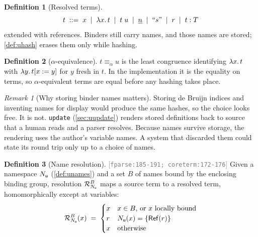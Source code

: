 \documentclass[11pt]{article}
\theoremstyle{definition}
\newtheorem{definition}{Definition}[section]
\theoremstyle{plain}
\theoremstyle{remark}
\newtheorem{remark}{Remark}[section]
\newcommand{\src}[1]{{\footnotesize\textcolor{gray}{[\texttt{#1}]}}}
\begin{document}
\begin{definition}[Resolved terms]\label{def:urterm}
\[
  t \;::=\; x \;\mid\; \lambda x.\,t \;\mid\; t\;u
        \;\mid\; \underline{n} \;\mid\; \text{``}s\text{''} \;\mid\; r \;\mid\; t : T
\]
 extended with references. Binders still carry names, and those names are stored;
\cref{def:uhash} erases them only while hashing.
\end{definition}

\begin{definition}[$\alpha$-equivalence]\label{def:ualpha}
$t \equiv_\alpha u$ is the least congruence identifying $\lambda x.\,t$ with $\lambda y.\,t[x := y]$ for
$y$ fresh in $t$. In the implementation it is the equality on terms, so $\alpha$-equivalent terms are
equal before any hashing takes place.
\end{definition}

\begin{remark}[Why storing binder names matters]\label{rem:names}
Storing de Bruijn indices and inventing names for display would produce the same hashes, so the
choice looks free. It is not. \texttt{update} (\cref{sec:uupdate}) renders stored definitions back to
source that a human reads and a parser resolves. Because names survive storage, the rendering uses
the author's variable names. A system that discarded them could state its round trip only up to a
choice of names.
\end{remark}

\begin{definition}[Name resolution]\label{def:uresolution}
\src{fparse:185-191; coreterm:172-176} Given a namespace $N_{\mathsf{u}}$ (\cref{def:unames}) and a set $B$ of
names bound by the enclosing binding group, resolution $\mathcal{R}^{B}_{N_{\mathsf{u}}}$ maps a source term
to a resolved term, homomorphically except at variables:
\[
  \mathcal{R}^{B}_{N_{\mathsf{u}}}(x) \;=\;
    \begin{cases}
      x & x \in B \text{, or } x \text{ locally bound}\\
      r & N_{\mathsf{u}}(x) = \{\mathsf{Ref}(r)\}\\
      x & \text{otherwise}
    \end{cases}
\]
\end{definition}
\end{document}
